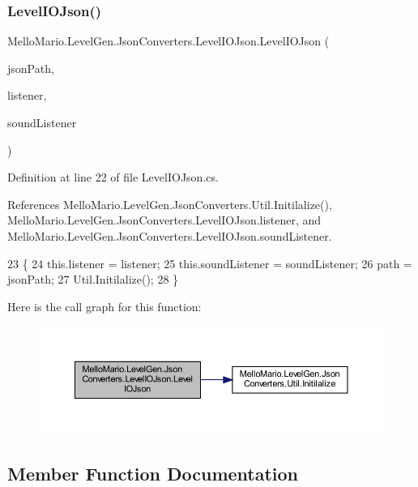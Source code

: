 \subsubsection{Level\+I\+O\+Json()}
{\footnotesize\ttfamily Mello\+Mario.\+Level\+Gen.\+Json\+Converters.\+Level\+I\+O\+Json.\+Level\+I\+O\+Json (\begin{DoxyParamCaption}\item[{string}]{json\+Path,  }\item[{\textbf{ I\+Listener}$<$ \textbf{ I\+Game\+Object} $>$}]{listener,  }\item[{\textbf{ I\+Listener}$<$ \textbf{ I\+Soundable} $>$}]{sound\+Listener }\end{DoxyParamCaption})}



Definition at line 22 of file Level\+I\+O\+Json.\+cs.



References Mello\+Mario.\+Level\+Gen.\+Json\+Converters.\+Util.\+Initilalize(), Mello\+Mario.\+Level\+Gen.\+Json\+Converters.\+Level\+I\+O\+Json.\+listener, and Mello\+Mario.\+Level\+Gen.\+Json\+Converters.\+Level\+I\+O\+Json.\+sound\+Listener.


\begin{DoxyCode}
23         \{
24             this.listener = listener;
25             this.soundListener = soundListener;
26             path = jsonPath;
27             Util.Initilalize();
28         \}
\end{DoxyCode}
Here is the call graph for this function\+:
\nopagebreak
\begin{figure}[H]
\begin{center}
\leavevmode
\includegraphics[width=350pt]{classMelloMario_1_1LevelGen_1_1JsonConverters_1_1LevelIOJson_a2e2efa1628d6af80e59d104e59a71eb6_cgraph}
\end{center}
\end{figure}


\subsection{Member Function Documentation}
\mbox{\label{classMelloMario_1_1LevelGen_1_1JsonConverters_1_1LevelIOJson_aa3fd52213102bf6ca317746b70eb5819}} 

